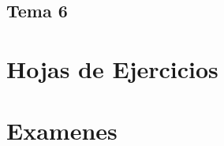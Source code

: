 \documentclass{apuntes}
\begin{document}
\section{Tema 6}







%



\chapter{Hojas de Ejercicios}


\chapter{Examenes}

\end{document}
